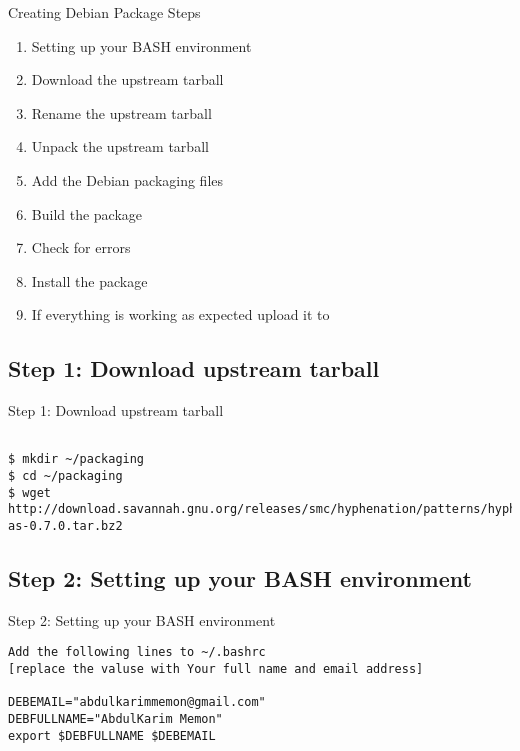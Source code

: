 \documentclass[red,10pt,a4paper]{beamer}
\begin{document}
\begin{frame}{Creating Debian Package Steps}
\begin{enumerate}
	\item Setting up your BASH environment
	\item Download the upstream tarball
	\item Rename the upstream tarball
	\item Unpack the upstream tarball
	\item Add the Debian packaging files
	\item Build the package
	\item Check for errors
	\item Install the package
	\item If everything is working as expected upload it to 
\end{enumerate}

\end{frame}

\subsection{Step 1: Download upstream tarball}

\begin{frame}[fragile]{Step 1: Download upstream tarball}
\lstset{breaklines=true}
\lstset{makemacrouse=true}
\begin{lstlisting}

$ mkdir ~/packaging
$ cd ~/packaging
$ wget http://download.savannah.gnu.org/releases/smc/hyphenation/patterns/hyphen-as-0.7.0.tar.bz2
    \end{lstlisting} 
\end{frame}



\subsection{Step 2: Setting up your BASH environment}

\begin{frame}[fragile]{Step 2: Setting up your BASH environment}
\lstset{breaklines=true}
\lstset{makemacrouse=true}
\begin{lstlisting}
Add the following lines to ~/.bashrc
[replace the valuse with Your full name and email address]

DEBEMAIL="abdulkarimmemon@gmail.com"
DEBFULLNAME="AbdulKarim Memon"
export $DEBFULLNAME $DEBEMAIL
    \end{lstlisting} 
\end{frame}
\end{document}
